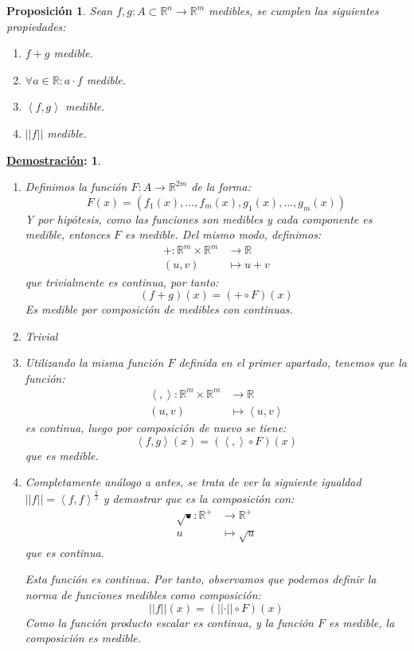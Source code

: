\documentclass[10pt,a4paper,openright]{book}
\theoremstyle{break}
\newtheorem*{prop}{Proposición}
\newtheorem*{demo}{\underline{Demostración}:}
\begin{document}
\begin{prop}
Sean $f, g: A\subset \mathbb{R}^n \rightarrow \mathbb{R}^m$ medibles, se cumplen las siguientes propiedades:
\begin{enumerate}
\item $f+g$ medible.
\item $\forall a \in \mathbb{R}: a\cdot f$ medible.
\item $\left<f, g\right>$ medible.
\item $\vert \vert f \vert \vert$ medible.
\end{enumerate}
\end{prop}
\begin{demo}
\begin{enumerate}
\item Definimos la función $F: A \rightarrow \mathbb{R}^{2m}$ de la forma:
$$F\left( x \right) = \left( f_1\left( x \right), \ldots, f_m\left( x \right), g_1\left( x \right), \ldots, g_m\left( x \right) \right)$$
Y por hipótesis, como las funciones son medibles y cada componente es medible, entonces $F$ es medible. Del mismo modo, definimos: 
\begin{align*}
+: \mathbb{R}^m \times \mathbb{R}^m & \rightarrow \mathbb{R} \\
\left( u, v \right) &\mapsto u+v
\end{align*}
que trivialmente es continua, por tanto:
$$\left( f + g \right)\left( x \right) = \left( + \circ F \right)\left( x \right)$$
Es medible por composición de medibles con continuas.

\item Trivial

\item Utilizando la misma función $F$ definida en el primer apartado, tenemos que la función:
\begin{align*}
\left<,\right>: \mathbb{R}^m \times \mathbb{R}^m & \rightarrow \mathbb{R} \\
\left( u, v \right) &\mapsto \left<u, v\right>
\end{align*}
es continua, luego por composición de nuevo se tiene:
$$\left<f, g\right> \left( x \right) = \left( \left<, \right> \circ F \right)\left( x \right)$$
que es medible.

\item Completamente análogo a antes, se trata de ver la siguiente igualdad $\vert \vert f \vert \vert = \left<f, f\right>^{\frac{1}{2}}$ y demostrar que es la composición con:
\begin{align*}
\sqrt{•}: \mathbb{R}^+ &\rightarrow \mathbb{R}^+ \\
u &\mapsto \sqrt{u}
\end{align*}
que es continua.

Esta función es continua. Por tanto, observamos que podemos definir la norma de funciones medibles como composición:
$$\vert \vert f \vert \vert \left( x \right) = \left( \vert \vert \cdot \vert \vert \circ F \right)\left( x \right)$$
Como la función producto escalar es continua, y la función $F$ es medible, la composición es medible.
\end{enumerate}
\end{demo}
\end{document}
